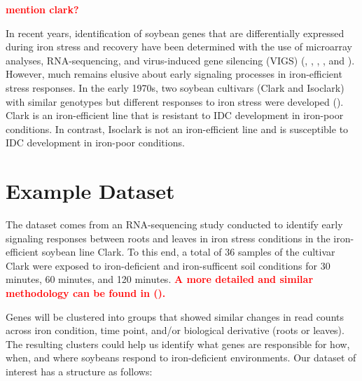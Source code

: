 \documentclass[11pt,a4paper,oldfontcommands,openany]{memoir}
\numberwithin{equation}{section} %
\begin{document}
\textbf{\textcolor{Red}{mention clark?}}

In recent years, identification of soybean genes that are differentially expressed during iron stress and recovery have been determined with the use of microarray analyses, RNA-sequencing, and virus-induced gene silencing (VIGS) (\citealt{soy11}, \citealt{soy12}, \citealt{soy13}, \citealt{soy14}, and \citealt{soy15}). However, much remains elusive about early signaling processes in iron-efficient stress responses. In the early 1970s, two soybean cultivars (Clark and Isoclark) with similar genotypes but different responses to iron stress were developed (\citealt{soy10}). Clark is an iron-efficient line that is resistant to IDC development in iron-poor conditions. In contrast, Isoclark is not an iron-efficient line and is susceptible to IDC development in iron-poor conditions.

\section{Example Dataset}

The dataset comes from an RNA-sequencing study conducted to identify early signaling responses between roots and leaves in iron stress conditions in the iron-efficient soybean line Clark. To this end, a total of 36 samples of the cultivar Clark were exposed to iron-deficient and iron-sufficent soil conditions for 30 minutes, 60 minutes, and 120 minutes. \textbf{\textcolor{Red}{A more detailed and similar methodology can be found in (\citealt{adSoy}).}}

Genes will be clustered into groups that showed similar changes in read counts across iron condition, time point, and/or biological derivative (roots or leaves). The resulting clusters could help us identify what genes are responsible for how, when, and where soybeans respond to iron-deficient environments. Our dataset of interest has a structure as follows:
\end{document}
